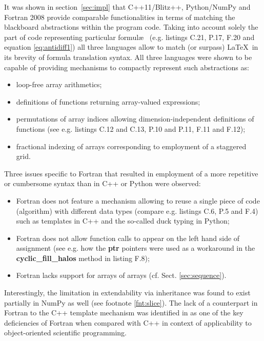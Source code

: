 \documentclass[final,5p,times,twocolumn]{elsarticle}
\newcommand{\prog}[1]{{\rm\bf#1}}
\begin{document}
  It was shown in section~\ref{sec:impl} that C++11/Blitz++, Python/NumPy and Fortran 2008
    provide comparable functionalities in terms of matching the blackboard abstractions
    within the program code.
  Taking into account solely the part of code representing particular formul\ae~
    (e.g. listings C.21, P.17, F.20 and equation \ref{eq:antidiff1}) all three
    languages allow to match (or surpass) \LaTeX~in its brevity of formula translation syntax.
  All three languages were shown to be capable of providing mechanisms to compactly represent such abstractions as:
  \begin{itemize}
    \item{loop-free array arithmetics;}
    \item{definitions of functions returning array-valued expressions;}
    \item{permutations of array indices allowing dimension-independent definitions
      of functions (see e.g. listings C.12 and C.13, P.10 and P.11, F.11 and F.12);}
    \item{fractional indexing of arrays corresponding to employment of a staggered grid.}
  \end{itemize}
  Three issues specific to Fortran that 
    resulted in employment of a more repetitive or cumbersome syntax than in C++ or Python
    were observed:
  \begin{itemize}
    \item{Fortran does not feature a mechanism allowing to reuse a single piece of code (algorithm)
      with different data types (compare e.g. listings C.6, P.5 and F.4) such as
      templates in C++ and the so-called duck typing in Python;}
    \item{Fortran does not allow function calls to appear on the left hand side
      of assignment (see e.g. how the \prog{ptr} pointers were used as a workaround in the \prog{cyclic\_fill\_halos}
      method in listing F.8);}
    \item{Fortran lacks support for arrays of arrays (cf. Sect. \ref{sec:sequence}).}
  \end{itemize}
  Interestingly, the limitation in extendability via inheritance was found to
    exist partially in NumPy as well (see footnote \ref{fnt:slice}).
  The lack of a counterpart in Fortran to the C++ template mechanism was identified in
    \citep{Cary_et_al_1997}
    as one of the key deficiencies of Fortran when compared with C++ in context 
    of applicability to object-oriented scientific programming.
\end{document}
